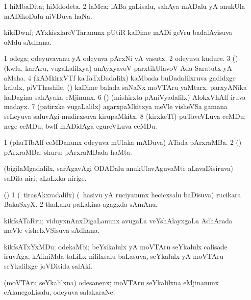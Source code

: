 \bentry
{}
\gl{\nA}
\bmng
\bnum
\num{1} hiMbaDita; hiMdodeta. 
\num{2} laMca; lABa gaLisalu, sahAya mADalu yA anukUla mADikoDalu niVDuva haNa. 
\enum
\emng
\eentry

\bentry
{}
\gl{\nA}
\bmng
kikfDwnf; AYxkisxlareVTaranunx pUtiR kaDime mADi geVru badalAyisuva oMdu sAdhana. 
\emng
\eentry

\bentry
{}
\gl{\nA}
\bmng
\bnum
\num{1} odega; odeyuvavanu yA odeyuva pArxNi yA vasutx. 
\num{2} odeyuva kudure. 
\num{3} (\AmA) (kwlu, karAru, \mo vugaLalilxya) anAyxyavoV parxtikUlavoV Ada Saratutx yA aMsha. 
\num{4} (kAMkirxVTf kaTaTxDadalilx) kaMbada buDadalilxruva gadidxge kalulx, piVThashile. 
 (\nw) 
\banum
{} kaDime balada saNaNx moVTAru yaMtarx. 
 parxyANika haDagina sahAyaka eMjinunx. 
\eanum
\numie
\num{6} (\ashi) (mishirxta pAniVyadalilx) AlokxVhAlf iruva madayx. 
\num{7} (patirxke \mo vugaLalilx) agarxpaMkitxya meVle visheVSa gamana seLeyuva saluvAgi mudirxsuva kirupaMkitx. 
\num{8} (kirxkeTf) puTaveVLuva ceMDu; nege ceMDu; bwlf mADidAga egureVLuva ceMDu. 
\enum
\emng
\eentry

\bentry
{}
\gl{\nA}
\bmng
\bnum
\num{1} (phuTfbAlf ceMDanunx odeyuva mUlaka mADuva) ATada pArxraMBa. 
\num{2} (\rUpa) pArxraMBa; shuru:  pArxraMBada haMta. 
\enum
\emng
\eentry

\bentry
{}
\gl{\nA}
\bmng
(bigilaMgadalilx, sarAgavAgi ODADalu anukUlavAguvaMte aLavaDisiruva) saDila niri; aLaLxka nirige. 
\emng
\eentry

\bentry
{}
\gl{\nA}
\bmng
(\pArxparx) 
\bnum
\num{1} (\sA\ tirasAkxradalilx) (\kanmu\ hasivu yA ruciyanunx hecicxsalu baDisuva) rucikara BakaSxyX. 
\num{2} thaLaku paLakina agagxda sAmAnu. 
\enum
\emng
\eentry

\bentry
{}
\gl{\nA}
\bmng
kikfsATaRru; viduyxnAnxDigaLanunx avugaLa veYshAlayxgaLa AdhArada meVle vishelxVSisuva sAdhana. 
\emng
\eentry

\bentry
{}
\gl{\nA}
\bmng
kikfsATxYxMDu; odekaMbi; beYsikalulx yA moVTAru seYkalulx calisade iruvAga, kAliniMda taLiLx nililxsalu baLasuva, seYkalulx yA moVTAru seYkalilxge joVDisida salAki. 
\emng
\eentry

\bentry
{}
\gl{\nA}
\bmng
(moVTAru seYkalilxna) odesanenx; moVTAru seYkalilxna eMjinanunx cAlanegoLisalu, odeyuva salakaraNe. 
\emng
\eentry

